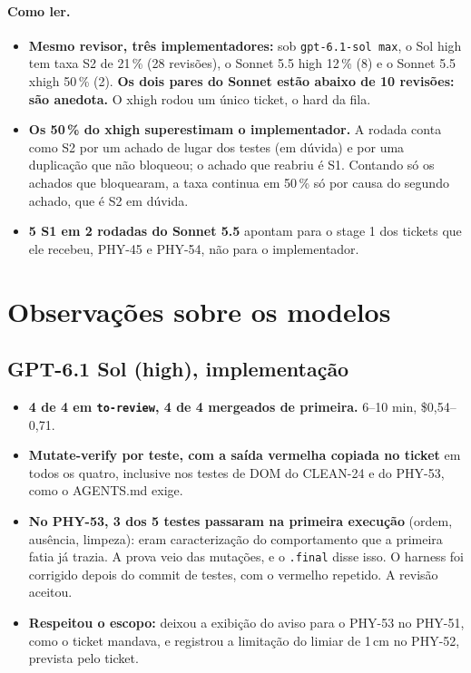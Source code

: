 \documentclass[11pt,a4paper]{article}
\begin{document}
\paragraph{Como ler.}
\begin{itemize}
  \item \textbf{Mesmo revisor, três implementadores:} sob
        \texttt{gpt-6.1-sol max}, o Sol high tem taxa S2 de 21\,\% (28
        revisões), o Sonnet 5.5 high 12\,\% (8) e o Sonnet 5.5 xhigh 50\,\%
        (2). \textbf{Os dois pares do Sonnet estão abaixo de 10 revisões: são
        anedota.} O xhigh rodou um único ticket, o hard da fila.
  \item \textbf{Os 50\,\% do xhigh superestimam o implementador.} A rodada
        conta como S2 por um achado de lugar dos testes (em dúvida) e por uma
        duplicação que não bloqueou; o achado que reabriu é S1. Contando só os
        achados que bloquearam, a taxa continua em 50\,\% só por causa do segundo
        achado, que é S2 em dúvida.
  \item \textbf{5 S1 em 2 rodadas do Sonnet 5.5} apontam para o stage 1
        dos tickets que ele recebeu, PHY-45 e PHY-54, não para o
        implementador.
\end{itemize}

\section{Observações sobre os modelos}

\subsection*{GPT-6.1 Sol (high), implementação}
\begin{itemize}
  \item \textbf{4 de 4 em \texttt{to-review}, 4 de 4 mergeados de primeira.}
        6--10 min, \$0,54--0,71.
  \item \textbf{Mutate-verify por teste, com a saída vermelha copiada no
        ticket} em todos os quatro, inclusive nos testes de DOM do CLEAN-24 e
        do PHY-53, como o AGENTS.md exige.
  \item \textbf{No PHY-53, 3 dos 5 testes passaram na primeira execução}
        (ordem, ausência, limpeza): eram caracterização do comportamento que a
        primeira fatia já trazia. A prova veio das mutações, e o
        \texttt{.final} disse isso. O harness foi corrigido depois do commit
        de testes, com o vermelho repetido. A revisão aceitou.
  \item \textbf{Respeitou o escopo:} deixou a exibição do aviso para o PHY-53
        no PHY-51, como o ticket mandava, e registrou a limitação do limiar de
        1\,cm no PHY-52, prevista pelo ticket.
\end{itemize}
\end{document}
